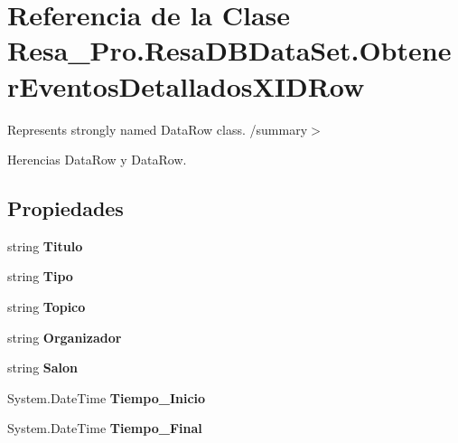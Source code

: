 \section{Referencia de la Clase Resa\+\_\+\+Pro.\+Resa\+D\+B\+Data\+Set.\+Obtener\+Eventos\+Detallados\+X\+I\+D\+Row}
\label{class_resa___pro_1_1_resa_d_b_data_set_1_1_obtener_eventos_detallados_x_i_d_row}


Represents strongly named Data\+Row class. /summary$>$  




Herencias Data\+Row y Data\+Row.

\subsection*{Propiedades}
\begin{DoxyCompactItemize}
\item 
string {\bfseries Titulo}\hspace{0.3cm}{\ttfamily  [get, set]}\label{class_resa___pro_1_1_resa_d_b_data_set_1_1_obtener_eventos_detallados_x_i_d_row_a96da88075e43215fbbb465fa189ac2e8}

\item 
string {\bfseries Tipo}\hspace{0.3cm}{\ttfamily  [get, set]}\label{class_resa___pro_1_1_resa_d_b_data_set_1_1_obtener_eventos_detallados_x_i_d_row_aa1d4a4840f39940027ba8248413c6e70}

\item 
string {\bfseries Topico}\hspace{0.3cm}{\ttfamily  [get, set]}\label{class_resa___pro_1_1_resa_d_b_data_set_1_1_obtener_eventos_detallados_x_i_d_row_a8feec2795626ba38d2cf7cc5c2baf495}

\item 
string {\bfseries Organizador}\hspace{0.3cm}{\ttfamily  [get, set]}\label{class_resa___pro_1_1_resa_d_b_data_set_1_1_obtener_eventos_detallados_x_i_d_row_ace7ede2176f45ef2abcb70d5601ab013}

\item 
string {\bfseries Salon}\hspace{0.3cm}{\ttfamily  [get, set]}\label{class_resa___pro_1_1_resa_d_b_data_set_1_1_obtener_eventos_detallados_x_i_d_row_a671e6774afe3524b88b993be8f34a965}

\item 
System.\+Date\+Time {\bfseries Tiempo\+\_\+\+Inicio}\hspace{0.3cm}{\ttfamily  [get, set]}\label{class_resa___pro_1_1_resa_d_b_data_set_1_1_obtener_eventos_detallados_x_i_d_row_a47185fb8f1d3111287233243554fd418}

\item 
System.\+Date\+Time {\bfseries Tiempo\+\_\+\+Final}\hspace{0.3cm}{\ttfamily  [get, set]}\label{class_resa___pro_1_1_resa_d_b_data_set_1_1_obtener_eventos_detallados_x_i_d_row_af040eaf9c808a66521b1c8a6b2b52fae}

\end{DoxyCompactItemize}
